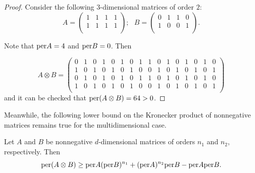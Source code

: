 \documentclass[a4paper]{article}
\begin{document}
\begin{proof}

Consider  the following $3$-dimensional matrices of order $2$:
$$  A = \left( \begin{array}{cc|cc}
1 & 1 & 1 & 1 \\
1 & 1 & 1 & 1 \\
\end{array} \right); ~~~
B = \left( \begin{array}{cc|cc}
0 & 1 & 1 & 0 \\
1 & 0 & 0 & 1 \\
\end{array} \right). 
$$

Note that ${\rm per} A =4$ and ${\rm per} B = 0$. Then 

$$ A \otimes B =
\left( \begin{array}{cccc|cccc|cccc|cccc}
0 & 1 & 0 & 1 &  0 & 1 & 0 & 1 & 1 & 0 & 1 & 0 &  1 & 0 & 1 & 0 \\
1 & 0 & 1 & 0 &  1 & 0 & 1 & 0 & 0 & 1 & 0 & 1 &  0 & 1 & 0 & 1 \\
0 & 1 & 0 & 1 &  0 & 1 & 0 & 1 & 1 & 0 & 1 & 0 &  1 & 0 & 1 & 0 \\
1 & 0 & 1 & 0 &  1 & 0 & 1 & 0 & 0 & 1 & 0 & 1 &  0 & 1 & 0 & 1 \\
\end{array} \right)
$$
and it can be checked that ${\rm per} (A \otimes B) = 64 > 0$.
\end{proof}


Meanwhile, the following lower bound on the Kronecker product of nonnegative matrices remains true for the multidimensional case. 


\begin{teorema}
Let $A$ and $B$ be nonnegative $d$-dimensional matrices of orders $n_1$ and $n_2$, respectively. Then
$${\rm per} (A \otimes B) \geq  {\rm per} A ({\rm per} B)^{n_1} +  ({\rm per} A)^{n_2} {\rm per} B - {\rm per} A {\rm per} B.$$
\end{teorema}
\end{document}
